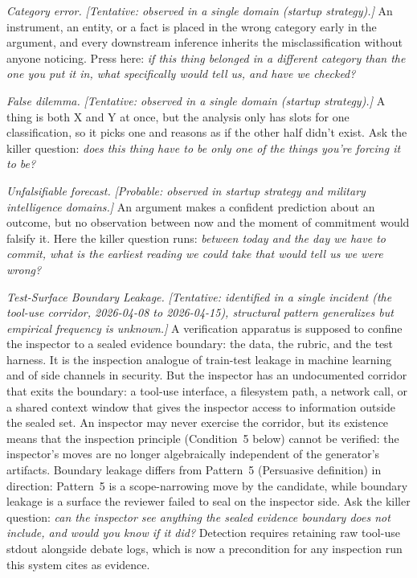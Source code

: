 \documentclass[
  11pt,
]{article}
\begin{document}
\emph{Category error.} \emph{{[}Tentative: observed in a single domain
(startup strategy).{]}} An instrument, an entity, or a fact is placed in
the wrong category early in the argument, and every downstream inference
inherits the misclassification without anyone noticing. Press here:
\emph{if this thing belonged in a different category than the one you put
it in, what specifically would tell us, and have we checked?}

\emph{False dilemma.} \emph{{[}Tentative: observed in a single
domain (startup strategy).{]}} A thing is both X and Y at once, but the
analysis only has slots for one classification, so it picks one and
reasons as if the other half didn't exist. Ask the killer question:
\emph{does this thing have to be only one of the things you're forcing it
to be?}

\emph{Unfalsifiable forecast.} \emph{{[}Probable: observed in startup
strategy and military intelligence domains.{]}} An argument makes a
confident prediction about an outcome, but no observation between now and
the moment of commitment would falsify it. Here the killer question runs:
\emph{between today and the day we have to commit, what is the earliest
reading we could take that would tell us we were wrong?}

\emph{Test-Surface Boundary Leakage.} \emph{{[}Tentative: identified
in a single incident (the tool-use corridor, 2026-04-08 to 2026-04-15),
structural pattern generalizes but empirical frequency is unknown.{]}} A
verification apparatus is supposed to confine the inspector to a sealed
evidence boundary: the data, the rubric, and the test harness. It is the inspection analogue of train-test leakage in machine learning and of side channels in security. But the
inspector has an undocumented corridor that exits the boundary: a
tool-use interface, a filesystem path, a network call, or a shared
context window that gives the inspector access to information outside the
sealed set. An inspector may never exercise the corridor, but its
existence means that the inspection principle (Condition~5 below) cannot
be verified: the inspector's moves are no longer algebraically
independent of the generator's artifacts. Boundary leakage differs from
Pattern~5 (Persuasive definition) in direction: Pattern~5 is a
scope-narrowing move by the candidate, while boundary leakage is a
surface the reviewer failed to seal on the inspector side. Ask the killer
question: \emph{can the inspector see anything the sealed evidence
boundary does not include, and would you know if it did?} Detection
requires retaining raw tool-use stdout alongside debate logs, which is
now a precondition for any inspection run this system cites as evidence.
\end{document}

